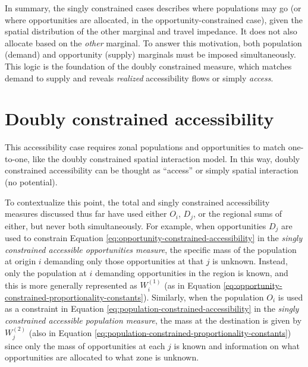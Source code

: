 \documentclass[
11pt, %
oneside, %
english, %
singlespacing, %
]{macthesis} %
\begin{document}
In summary, the singly constrained cases describes where populations may go (or where opportunities are allocated, in the opportunity-constrained case), given the spatial distribution of the other marginal and travel impedance. It does not also allocate based on the \emph{other} marginal. To answer this motivation, both population (demand) and opportunity (supply) marginals must be imposed simultaneously. This logic is the foundation of the doubly constrained measure, which matches demand to supply and reveals \emph{realized} accessibility flows or simply \emph{access}.

\section{Doubly constrained accessibility}\label{doubly-constrained-accessibility}

This accessibility case requires zonal populations and opportunities to match one-to-one, like the doubly constrained spatial interaction model. In this way, doubly constrained accessibility can be thought as ``access'' or simply spatial interaction (no potential).

To contextualize this point, the total and singly constrained accessibility measures discussed thus far have used either \(O_i\), \(D_j\), or the regional sums of either, but never both simultaneously. For example, when opportunities \(D_j\) are used to constrain Equation \ref{eq:opportunity-constrained-accessibility} in the \emph{singly constrained accessible opportunities measure}, the specific mass of the population at origin \(i\) demanding only those opportunities at that \(j\) is unknown. Instead, only the population at \(i\) demanding opportunities in the region is known, and this is more generally represented as \(W_i^{(1)}\) (as in Equation \ref{eq:opportunity-constrained-proportionality-constants}). Similarly, when the population \(O_i\) is used as a constraint in Equation \ref{eq:population-constrained-accessibility} in the \emph{singly constrained accessible population measure}, the mass at the destination is given by \(W_j^{(2)}\) (also in Equation \ref{eq:population-constrained-proportionality-constants}) since only the mass of opportunities at each \(j\) is known and information on what opportunities are allocated to what zone is unknown.
\end{document}
